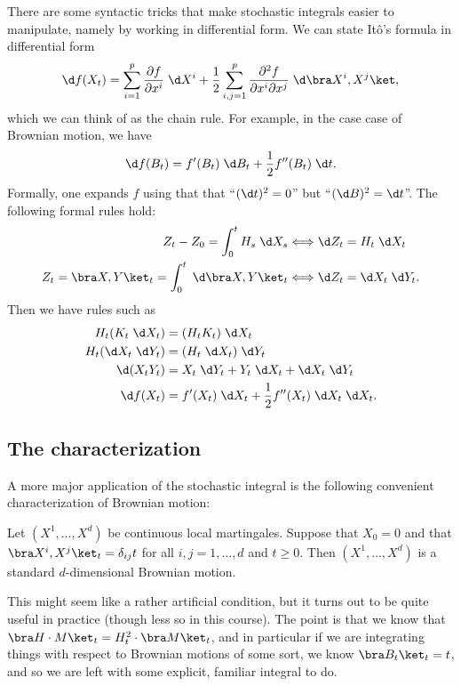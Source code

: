 \documentclass[a4paper]{article}
\begin{document}
There are some syntactic tricks that make stochastic integrals easier to manipulate, namely by working in differential form. We can state It\^o's formula in differential form
\[
  \d f(X_t) = \sum_{i = 1}^p \frac{\partial f}{\partial x^i} \;\d X^i + \frac{1}{2} \sum_{i, j = 1}^p \frac{\partial^2 f}{\partial x^i\partial x^j} \;\d \bra X^i, X^j\ket,
\]
which we can think of as the chain rule. For example, in the case case of Brownian motion, we have
\[
  \d f(B_t) = f'(B_t) \;\d B_t + \frac{1}{2} f''(B_t) \;\d t.
\]
Formally, one expands $f$ using that that ``$(\d t)^2 = 0$'' but ``$(\d B)^2 = \d t$''. The following formal rules hold:
\begin{align*}
  Z_t - Z_0 = \int_0^t H_s \;\d X_s &\Longleftrightarrow \d Z_t = H_t \;\d X_t\\
  Z_t = \bra X, Y\ket_t = \int_0^t \;\d \bra X, Y\ket_t &\Longleftrightarrow \d Z_t = \d X_t \;\d Y_t.
\end{align*}
Then we have rules such as
\begin{align*}
  H_t(K_t \;\d X_t) &= (H_t K_t)\;\d X_t\\
  H_t (\d X_t \;\d Y_t) &= (H_t \;\d X_t)\;\d Y_t\\
  \d (X_t Y_t) &= X_t \;\d Y_t + Y_t \;\d X_t + \d X_t \;\d Y_t\\
  \d f(X_t) &= f'(X_t) \;\d X_t + \frac{1}{2} f''(X_t) \;\d X_t\;\d X_t.
\end{align*}

\subsection{The  characterization}
A more major application of the stochastic integral is the following convenient characterization of Brownian motion:
\begin{thm}
  Let $(X^1, \ldots, X^d)$ be continuous local martingales. Suppose that $X_0 = 0$ and that $\bra X^i, X^j\ket_t = \delta_{ij} t$ for all $i, j = 1, \ldots, d$ and $t \geq 0$. Then $(X^1, \ldots, X^d)$ is a standard $d$-dimensional Brownian motion.
\end{thm}
This might seem like a rather artificial condition, but it turns out to be quite useful in practice (though less so in this course). The point is that we know that $\bra H \cdot M\ket_t = H^2_t \cdot \bra M\ket_t$, and in particular if we are integrating things with respect to Brownian motions of some sort, we know $\bra B_t \ket_t = t$, and so we are left with some explicit, familiar integral to do.
\end{document}
